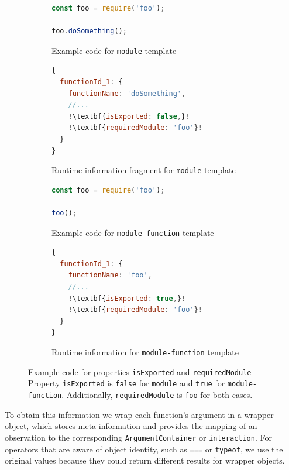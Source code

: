 \documentclass[sigconf]{acmart}
\begin{document}
\begin{figure}[t]
  \begin{subfigure}[t]{0.48\linewidth}
    \begin{lstlisting}[language=JavaScript,numbers=none]
const foo = require('foo');

foo.doSomething();
    \end{lstlisting}
  \caption{Example code for \texttt{module} template}
  \end{subfigure}
  \hfill
  \begin{subfigure}[t]{0.48\linewidth}
    \begin{lstlisting}[language=JavaScript,numbers=none,escapechar=!]
{
  functionId_1: {
    functionName: 'doSomething',
    //...
    !\textbf{isExported: false,}!
    !\textbf{requiredModule: 'foo'}!
  }
}    
    \end{lstlisting}
    \caption{Runtime information fragment for \texttt{module} template}
  \end{subfigure}

  \begin{subfigure}[t]{0.48\linewidth}
    \begin{lstlisting}[language=JavaScript,numbers=none]
const foo = require('foo');

foo();
    \end{lstlisting}
    \caption{Example code for \texttt{module-function} template}
  \end{subfigure}
  \hfill
  \begin{subfigure}[t]{0.48\linewidth}
    \begin{lstlisting}[language=JavaScript,numbers=none,escapechar=!]
{
  functionId_1: {
    functionName: 'foo',
    //...
    !\textbf{isExported: true,}!
    !\textbf{requiredModule: 'foo'}!
  }
}    
    \end{lstlisting}
    \caption{Runtime information for \texttt{module-function} template}
  \end{subfigure}
  \caption{Example code for properties \texttt{isExported} and \texttt{requiredModule} - Property \texttt{isExported} is
  \texttt{false} for \texttt{module} and \texttt{true} for \texttt{module-function}. Additionally, \texttt{requiredModule}
  is \texttt{foo} for both cases.
  }
  \label{fig:example-is-exported-required-module}
\end{figure}

To obtain this information we wrap each function's argument in a wrapper object, which stores meta-information and provides the mapping of an observation 
to the corresponding \texttt{ArgumentContainer} or
\texttt{interaction}. For operators that are aware of object identity, such as 
\texttt{===} or \texttt{typeof}, we use the original values because
they could return different results for wrapper objects.
\end{document}
